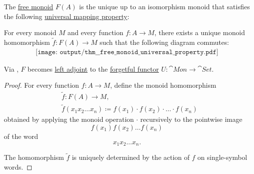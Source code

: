 \begin{proposition}\label{thm:free_monoid_universal_property}
  The \hyperref[def:free_monoid]{free monoid} \( F(A) \) is the unique up to an isomorphism monoid that satisfies the following \hyperref[rem:universal_mapping_property]{universal mapping property}:
  \begin{displayquote}
    For every monoid \( M \) and every function \( f: A \to M \), there exists a unique monoid homomorphism \( \widetilde{f}: F(A) \to M \) such that the following diagram commutes:
    \begin{equation}\label{eq:thm:free_monoid_universal_property/diagram}
      \begin{aligned}
        \texttt{[image: output/thm\_\_free\_monoid\_universal\_property.pdf]}
      \end{aligned}
    \end{equation}
  \end{displayquote}

  Via , \( F \) becomes \hyperref[def:category_adjunction]{left adjoint} to the \hyperref[def:concrete_category]{forgetful functor} \( U: \cat{Mon} \to \cat{Set} \).
\end{proposition}
\begin{proof}
  For every function \( f: A \to M \), define the monoid homomorphism
  \begin{equation*}
    \begin{aligned}
      &\widetilde{f}: F(A) \to M, \\
      &\widetilde{f}(x_1 x_2 \ldots x_n) \coloneqq f(x_1) \cdot f(x_2) \cdot \ldots \cdot f(x_n)
    \end{aligned}
  \end{equation*}
  obtained by applying the monoid operation \( \cdot \) recursively to the pointwise image
  \begin{equation*}
    f(x_1) f(x_2) \ldots f(x_n)
  \end{equation*}
  of the word
  \begin{equation*}
    x_1 x_2 \ldots x_n.
  \end{equation*}

  The homomorphism \( \widetilde{f} \) is uniquely determined by the action of \( f \) on single-symbol words.
\end{proof}

